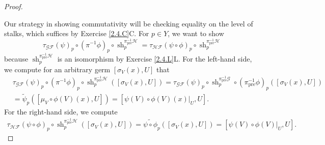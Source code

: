 \documentclass{article}
\newcommand{\fF}{\mathscr{F}}
\newcommand{\fG}{\mathscr{G}}
\newcommand{\fH}{\mathscr{H}}
\DeclareMathOperator{\pre}{\mathrm{pre}}
\DeclareMathOperator{\sh}{sh}
\begin{document}
\begin{proof}
\begin{center}
    \end{center}
    Our strategy in showing commutativity will be checking equality on the level of stalks, which suffices by Exercise \ref{2.4.C}C. For $p\in Y$, we want to show
    \[
    \tau_{\fG \fF}(\psi)_p \circ (\pi^{-1} \phi)_p \circ \sh^{\pi^{-1}_{\pre}\fH}_p = \tau_{\fH \fF}(\psi \circ \phi)_p \circ \sh_p^{\pi^{-1}_{\pre}\fH}
    \]
    because $\sh_p^{\pi^{-1}_{\pre}\fH}$ is an isomorphism by Exercise \ref{2.4.L}L.
    For the left-hand side, we compute for an arbitrary germ $[\sigma_V(x),U]$ that
    \begin{align*}
        &\tau_{\fG \fF}(\psi)_p \circ (\pi^{-1} \phi)_p \circ \sh^{\pi^{-1}_{\pre}\fH}_p ([\sigma_V(x),U])= \tau_{\fG \fF} (\psi)_p \circ \sh_p^{\pi^{-1}_{\pre} \fG} \circ (\pi^{-1}_{\pre} \phi)_p([\sigma_V(x),U])\\
        &=\tilde \psi_p ([\mu_V \circ \phi(V)(x),U]) = [\psi(V)\circ \phi(V)(x)\vert_U,U].
    \end{align*}
    For the right-hand side, we compute
    \begin{align*}
        \tau_{\fH \fF}(\psi \circ \phi)_p \circ \sh_p^{\pi^{-1}_{\pre}\fH} ([\sigma_V(x),U])=\widetilde{\psi \circ \phi}_p([\sigma_V(x),U])=[\psi(V)\circ \phi(V)\vert_U,U].
    \end{align*}


\end{proof}
\end{document}
